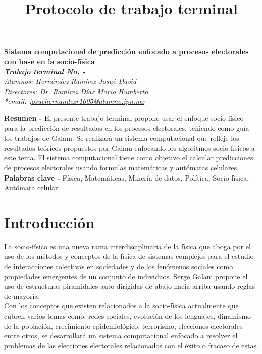 \documentclass[letterpaper, 10pt]{article}
\title{Protocolo de trabajo terminal}
\def\letra#1#2{%
\tamanyo=#1%
\interlinea=1.2\tamanyo%
\fontfamily{ptm}
\fontsize{\the\tamanyo}%
{\the\interlinea}\selectfont#2}
\begin{document}
\begin{center}
    \letra{14pt}{\textbf{Sistema computacional de predicción enfocado a procesos electorales con base en la socio-física}}\\
    \letra{12pt}{\textbf{\textit{Trabajo terminal No. -}}} \\
    \letra{12pt}{\textit{Alumnos: Hernández Ramírez Josué David}} \\
    \letra{12pt}{\textit{Directores: Dr. Ramírez Díaz Mario Humberto}} \\
    \letra{12pt}{\textcolor{black}{\textit{*email: \url{josuehernandezr1605@alumno.ipn.mx}}}}
\end{center}

\textbf{Resumen -} El presente trabajo terminal propone usar el enfoque socio físico para la predicción de resultados en los procesos electorales, teniendo como guía los trabajos de Galam.  Se realizará un sistema computacional que refleje los resultados teóricos propuestos por Galam enfocando los algoritmos socio físicos a este tema. El sistema computacional tiene como objetivo el calcular predicciones de procesos electorales usando formulas matemáticas y autómatas celulares.
\newline
\textbf{Palabras clave -} Física, Matemáticas, Minería de datos, Política, Socio-física, Autómata celular.

\section{Introducción}

La socio-físico es una nueva rama interdisciplinaria de la física que aboga por el uso de los métodos y conceptos de la física de sistemas complejos para el estudio de interacciones colectivas en sociedades y de los fenómenos sociales como propiedades emergentes de un conjunto de individuos. Serge Galam propone el uso de estructuras piramidales auto-dirigidas de abajo hacia arriba usando reglas de mayoría. \cite{MarioH.RamirezDiaz2014, Galam.1986, Galam1990, Galam1991, Galam2000}
\\
\vspace{5mm} %
Con los conceptos que existen relacionados a la socio-física actualmente que cubren varios temas como: redes sociales, evolución de los lenguajes, dinamismo de la población, crecimiento epidemiológico, terrorismo, elecciones electorales entre otros, se desarrollará un sistema computacional enfocado a resolver el problemas de las elecciones electorales relacionados con el éxito o fracaso de estas.
\end{document}
